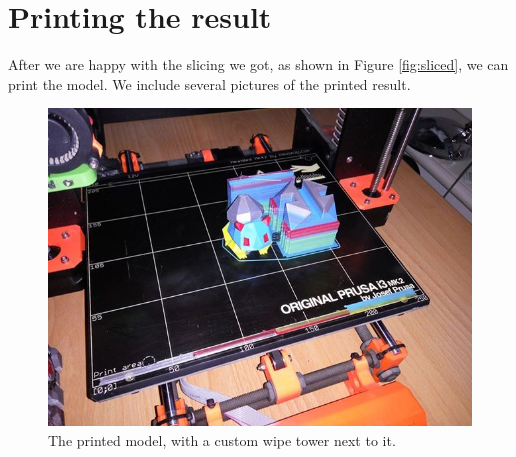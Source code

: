 \section{Printing the result}

After we are happy with the slicing we got, as shown in Figure \ref{fig:sliced}, we can print the model. We include several pictures of the printed result.

\begin{figure}
	\centering
	\includegraphics[scale=0.6]{images/printed_bulba.jpg}
	\caption{The printed model, with a custom wipe tower next to it.}
	\label{fig:printed1}
\end{figure}

